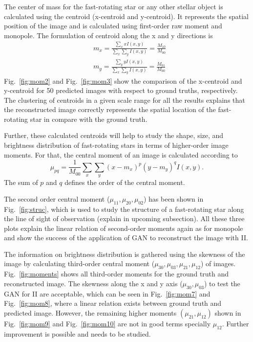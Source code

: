 The center of mass for the fast-rotating star or any other stellar object is calculated using the centroid (x-centroid and y-centroid). It represents the spatial position of the image and is calculated using first-order raw moment and monopole. The formulation of centroid along the x and y directions is
\begin{equation}
	\begin{aligned}
		&m_x = \frac{\sum_{x} x I(x,y)}{\sum_{x} \sum_{y} I(x, y)} = \frac{M_{10}}{M_{00}} \\
		&m_y = \frac{\sum_{y} y I(x,y)}{\sum_{x} \sum_{y} I(x, y)} = \frac{M_{01}}{M_{00}}
	\end{aligned}  
\end{equation}
Fig.~\ref{fig:mom2} and Fig.~\ref{fig:mom3} show the comparison of the x-centroid and y-centroid for 50 predicted images with respect to ground truths, respectively. The clustering of centroids in a given scale range for all the results explains that the reconstructed image correctly represents the spatial location of the fast-rotating star in compare with the ground truth.

Further, these calculated centroids will help to study the shape, size, and brightness distribution of fast-rotating stars in terms of higher-order image moments. For that, the central moment of an image is calculated according to
\begin{equation}
	\mu_{pq} = \frac{1}{M_{00}}\sum_{x} \sum_{y} (x - m_x)^p (y - m_y)^q I(x, y).
\end{equation}
The sum of $p$ and $q$ defines the order of the central moment.

The second order central moment ($\mu_{11}, \mu_{20}, \mu_{02}$) has been shown in Fig.~\ref{fig:struc}, which is used to study the structure of a fast-rotating star along the line of sight of observation (explain in upcoming subsection). All these three plots explain the linear relation of second-order moments again as for monopole and show the success of the application of GAN to reconstruct the image with II.

The information on brightness distribution is gathered using the skewness of the image by calculating third-order central moment ($\mu_{30}, \mu_{03}, \mu_{21}, \mu_{12}$) of images. Fig.~\ref{fig:moments} shows all third-order moments for the ground truth and reconstructed image. The skewness along the x and y axis ($\mu_{30}, \mu_{03}$) to test the GAN for II are acceptable, which can be seen in Fig.~\ref{fig:mom7} and Fig.~\ref{fig:mom8}, where a linear relation exists between ground truth and predicted image. However, the remaining higher moments $(\mu_{21}, \mu_{12})$ shown in Fig.~\ref{fig:mom9} and Fig.~\ref{fig:mom10} are not in good terms specially $\mu_{12}$. Further improvement is possible and needs to be studied.

